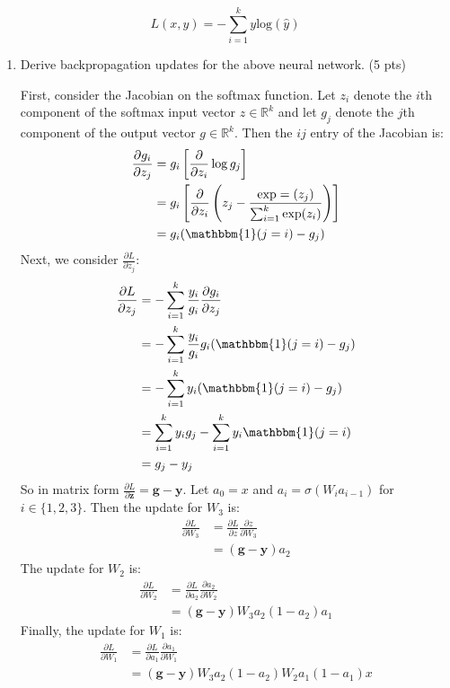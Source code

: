\documentclass[a4paper]{article}
\theoremstyle{definition}
\newenvironment{soln}{
    \leavevmode\color{blue}\ignorespaces
}{}
\begin{document}
\[
L(x, y) = -\sum_{i=1}^k y \text{log}(\hat{y})
\]

\begin{enumerate}
    \item Derive backpropagation updates for the above neural network. (5 pts)
    
    \begin{soln}
        First, consider the Jacobian on the softmax function.
        Let $z_i$ denote the $i$th component of the softmax input vector $z \in \mathbb{R}^{k}$ and let $g_j$ denote the $j$th component of the output vector $g \in \mathbb{R}^{k}$. Then the $ij$ entry of the Jacobian is:
        $$
        \begin{aligned}
            \frac{\partial g_i}{\partial z_j} & = g_i \left[\frac{\partial}{\partial z_i} \log g_j \right] \\
            & = g_i \left[ \frac{\partial}{\partial z_i} \left(z_j - \frac{\exp=(z_j)}{\sum_{i=1}^{k} \exp(z_i)}\right) \right] \\
            & = g_i (\mathbbm{1}(j = i) - g_j)
        \end{aligned}
        $$
        Next, we consider $\frac{\partial L}{\partial z_j}$:
        $$
        \begin{aligned}
            \frac{\partial L}{\partial z_j} & = -\sum_{i = 1}^{k} \frac{y_i}{g_i} \frac{\partial g_i}{\partial z_j} \\
            & = -\sum_{i = 1}^{k} \frac{y_i}{g_i} g_i (\mathbbm{1}(j = i) - g_j) \\
            & = -\sum_{i = 1}^{k} y_i (\mathbbm{1}(j = i) - g_j) \\
            & = \sum_{i = 1}^{k} y_i g_j - \sum_{i = 1}^{k} y_i \mathbbm{1}(j = i) \\
            & = g_j - y_j
        \end{aligned}
        $$
        So in matrix form $\frac{\partial L}{\partial \mathbf{z}} = \mathbf{g} - \mathbf{y}$. Let $a_0 = x$ and $a_i = \sigma(W_i a_{i-1})$ for $i \in \{1, 2, 3\}$. Then the update for $W_3$ is:
        $$
        \begin{aligned}
            \frac{\partial L}{\partial W_3} & = \frac{\partial L}{\partial z} \frac{\partial z}{\partial W_3} \\
            & = (\mathbf{g} - \mathbf{y}) a_2
        \end{aligned}
        $$
        The update for $W_2$ is:
        $$
        \begin{aligned}
            \frac{\partial L}{\partial W_2} & = \frac{\partial L}{\partial a_2} \frac{\partial a_2}{\partial W_2} \\
            & = (\mathbf{g} - \mathbf{y}) W_3 a_2 (1 - a_2) a_1
        \end{aligned}
        $$
        Finally, the update for $W_1$ is:
        $$
        \begin{aligned}
        \frac{\partial L}{\partial W_1} & = \frac{\partial L}{\partial a_1} \frac{\partial a_1}{\partial W_1} \\
        & = (\mathbf{g} - \mathbf{y}) W_3 a_2 (1 - a_2) W_2 a_1 (1 - a_1) x
        \end{aligned}
        $$
    \end{soln}


\end{enumerate}
\end{document}
